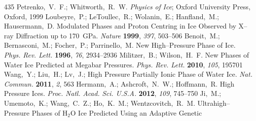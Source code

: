 \documentclass[12pt,letterpaper,oneside]{article}
\begin{document}
\begin{mcitethebibliography}{435}
{\mcitedefaultendpunct}{\mcitedefaultseppunct}\relax
\EndOfBibitem
{}
Petrenko,~V.~F.; Whitworth,~R.~W. \emph{Physics of Ice}; Oxford University
  Press, Oxford, 1999\relax
\mciteBstWouldAddEndPuncttrue
\mciteSetBstMidEndSepPunct{\mcitedefaultmidpunct}
{\mcitedefaultendpunct}{\mcitedefaultseppunct}\relax
\EndOfBibitem
{}
Loubeyre,~P.; LeToullec,~R.; Wolanin,~E.; Hanfland,~M.; Hausermann,~D.
  Modulated Phases and Proton Centring in Ice Observed by X--ray Diffraction up
  to 170~GPa. \emph{Nature} \textbf{1999}, \emph{397}, 503--506\relax
\mciteBstWouldAddEndPuncttrue
\mciteSetBstMidEndSepPunct{\mcitedefaultmidpunct}
{\mcitedefaultendpunct}{\mcitedefaultseppunct}\relax
\EndOfBibitem
{}
Benoit,~M.; Bernasconi,~M.; Focher,~P.; Parrinello,~M. New High--Pressure Phase
  of Ice. \emph{Phys. Rev. Lett.} \textbf{1996}, \emph{76}, 2934--2936\relax
\mciteBstWouldAddEndPuncttrue
\mciteSetBstMidEndSepPunct{\mcitedefaultmidpunct}
{\mcitedefaultendpunct}{\mcitedefaultseppunct}\relax
\EndOfBibitem
{}
Militzer,~B.; Wilson,~H.~F. New Phases of Water Ice Predicted at Megabar
  Pressures. \emph{Phys. Rev. Lett.} \textbf{2010}, \emph{105}, 195701\relax
\mciteBstWouldAddEndPuncttrue
\mciteSetBstMidEndSepPunct{\mcitedefaultmidpunct}
{\mcitedefaultendpunct}{\mcitedefaultseppunct}\relax
\EndOfBibitem
{}
Wang,~Y.; Liu,~H.; Lv,~J.;   High Pressure
  Partially Ionic Phase of Water Ice. \emph{Nat. Commun.} \textbf{2011},
  \emph{2}, 563\relax
\mciteBstWouldAddEndPuncttrue
\mciteSetBstMidEndSepPunct{\mcitedefaultmidpunct}
{\mcitedefaultendpunct}{\mcitedefaultseppunct}\relax
\EndOfBibitem
{}
Hermann,~A.; Ashcroft,~N.~W.; Hoffmann,~R. High Pressure Ices. \emph{Proc.
  Natl. Acad. Sci. U.S.A.} \textbf{2012}, \emph{109}, 745--750\relax
\mciteBstWouldAddEndPuncttrue
\mciteSetBstMidEndSepPunct{\mcitedefaultmidpunct}
{\mcitedefaultendpunct}{\mcitedefaultseppunct}\relax
\EndOfBibitem
{}
Ji,~M.; Umemoto,~K.; Wang,~C.~Z.; Ho,~K.~M.; Wentzcovitch,~R.~M.
  Ultrahigh--Pressure Phases of H$_2$O Ice Predicted Using an Adaptive Genetic

\end{mcitethebibliography}
\end{document}
